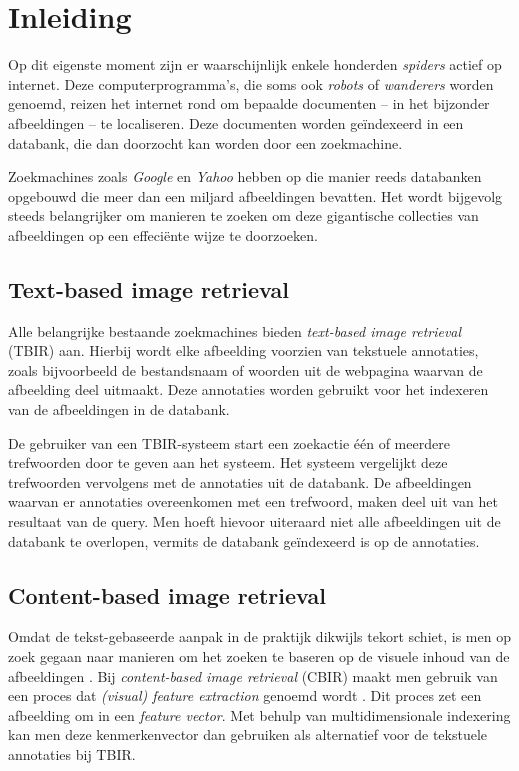 \chapter{Inleiding}

Op dit eigenste moment zijn er waarschijnlijk enkele honderden \emph{spiders} actief op internet.
Deze computerprogramma's, die soms ook \emph{robots} of \emph{wanderers} worden genoemd, reizen
het internet rond om bepaalde documenten -- in het bijzonder afbeeldingen -- te localiseren. Deze 
documenten worden ge\"indexeerd in een databank, die dan doorzocht kan worden door een zoekmachine. 

Zoekmachines zoals \emph{Google} en \emph{Yahoo} hebben op die manier reeds databanken
opgebouwd die meer dan een miljard afbeeldingen bevatten. Het wordt bijgevolg steeds belangrijker
om manieren te zoeken om deze gigantische collecties van afbeeldingen op een effeci\"ente wijze
te doorzoeken.


\section{Text-based image retrieval}

Alle belangrijke bestaande zoekmachines bieden \emph{text-based image retrieval} (TBIR) aan. 
Hierbij wordt elke afbeelding voorzien van tekstuele annotaties, zoals bijvoorbeeld de 
bestandsnaam of woorden uit de webpagina waarvan de afbeelding deel uitmaakt. Deze annotaties
worden gebruikt voor het indexeren van de afbeeldingen in de databank.

De gebruiker van een TBIR-systeem start een zoekactie \'e\'en of meerdere trefwoorden door te geven
aan het systeem. Het systeem vergelijkt deze trefwoorden vervolgens met de annotaties uit
de databank. De afbeeldingen waarvan er annotaties overeenkomen met een trefwoord, maken
deel uit van het resultaat van de query. Men hoeft hievoor uiteraard niet alle afbeeldingen
uit de databank te overlopen, vermits de databank ge\"indexeerd is op de annotaties. 

\section{Content-based image retrieval}

Omdat de tekst-gebaseerde aanpak in de praktijk dikwijls tekort schiet, is men op zoek gegaan 
naar manieren om het zoeken te baseren op de visuele inhoud van de afbeeldingen 
\cite{veltcamp:cbirs}. Bij \emph{content-based image retrieval} (CBIR) maakt men gebruik van een proces dat 
\emph{(visual) feature extraction} genoemd wordt \cite{rui:image_retr}. Dit proces zet een afbeelding om in een 
\emph{feature vector}. Met behulp van multidimensionale indexering kan men deze kenmerkenvector
dan gebruiken als alternatief voor de tekstuele annotaties bij TBIR.

